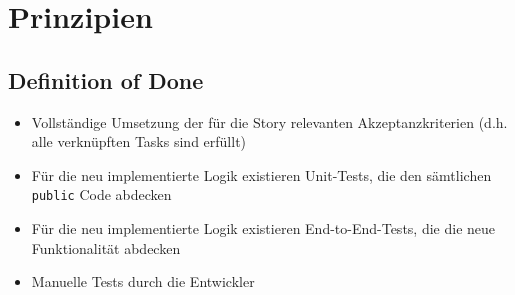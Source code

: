 \documentclass[../main.tex]{subfiles}
\begin{document}
    \section{Prinzipien}
	\subsection{Definition of Done}
	\label{section:DefinitionOfDone}
	\begin{itemize}
		\item Vollständige Umsetzung der für die Story relevanten Akzeptanzkriterien (d.h. alle verknüpften Tasks sind erfüllt)
		\item Für die neu implementierte Logik existieren Unit-Tests, die den sämtlichen \lstinline|public| Code abdecken
		\item Für die neu implementierte Logik existieren End-to-End-Tests, die die neue Funktionalität abdecken
		\item Manuelle Tests durch die Entwickler
	\end{itemize}
\end{document}
